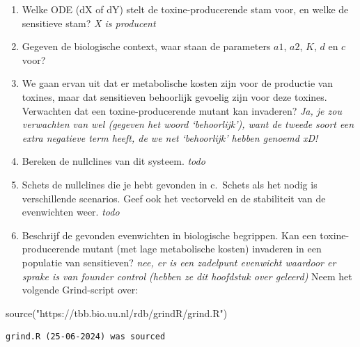 \documentclass[
  a4paper,
]{scrbook}
\newenvironment{Shaded}{\begin{snugshade}}{\end{snugshade}}
\newcommand{\FunctionTok}[1]{\textcolor[rgb]{0.28,0.35,0.67}{#1}}
\newcommand{\NormalTok}[1]{\textcolor[rgb]{0.00,0.23,0.31}{#1}}
\newcommand{\StringTok}[1]{\textcolor[rgb]{0.13,0.47,0.30}{#1}}
\providecommand{\tightlist}{%
  \setlength{\itemsep}{0pt}\setlength{\parskip}{0pt}}\usepackage{longtable,booktabs,array}
\theoremstyle{definition}
\theoremstyle{remark}
\begin{document}
\begin{tcolorbox}
\begin{enumerate}
\def\labelenumi{\alph{enumi}.}
\tightlist
\item
  Welke ODE (dX of dY) stelt de toxine-producerende stam voor, en welke
  de sensitieve stam? \emph{X is producent}
\item
  Gegeven de biologische context, waar staan de parameters \(a1\),
  \(a2\), \(K\), \(d\) en \(c\) voor?
\item
  We gaan ervan uit dat er metabolische kosten zijn voor de productie
  van toxines, maar dat sensitieven behoorlijk gevoelig zijn voor deze
  toxines. Verwachten dat een toxine-producerende mutant kan invaderen?
  \emph{Ja, je zou verwachten van wel (gegeven het woord `behoorlijk'),
  want de tweede soort een extra negatieve term heeft, de we net
  `behoorlijk' hebben genoemd xD!}
\item
  Bereken de nullclines van dit systeem. \emph{todo}
\item
  Schets de nullclines die je hebt gevonden in c.~Schets als het nodig
  is verschillende scenarios. Geef ook het vectorveld en de stabiliteit
  van de evenwichten weer. \emph{todo}
\item
  Beschrijf de gevonden evenwichten in biologische begrippen. Kan een
  toxine-producerende mutant (met lage metabolische kosten) invaderen in
  een populatie van sensitieven? \emph{nee, er is een zadelpunt
  evenwicht waardoor er sprake is van founder control (hebben ze dit
  hoofdstuk over geleerd)} Neem het volgende Grind-script over:
\end{enumerate}

\begin{Shaded}
\begin{Highlighting}[]
\FunctionTok{source}\NormalTok{(}\StringTok{"https://tbb.bio.uu.nl/rdb/grindR/grind.R"}\NormalTok{)}
\end{Highlighting}
\end{Shaded}

\begin{verbatim}
grind.R (25-06-2024) was sourced
\end{verbatim}


\end{tcolorbox}
\end{document}

